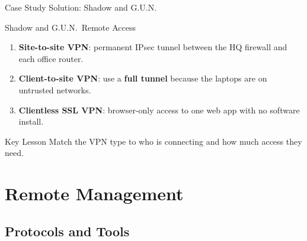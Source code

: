 \documentclass[aspectratio=169]{beamer}  %
\begin{document}
\begin{frame}[t]{Case Study Solution: Shadow and G.U.N.}
    \begin{casesolution}{Shadow and G.U.N.\ Remote Access}
        \begin{enumerate}
            \footnotesize
            \item \textbf{Site-to-site VPN}: permanent IPsec tunnel between the HQ firewall and each office router.
            \item \textbf{Client-to-site VPN}: use a \textbf{full tunnel} because the laptops are on untrusted networks.
            \item \textbf{Clientless SSL VPN}: browser-only access to one web app with no software install.
        \end{enumerate}
    \end{casesolution}
    \vspace{0.2em}
    \begin{alertblock}{Key Lesson}
        \footnotesize Match the VPN type to who is connecting and how much access they need.
    \end{alertblock}
\end{frame}

\section{Remote Management}
\subsection{Protocols and Tools}

\end{document}
